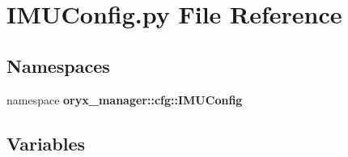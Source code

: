 \section{\-I\-M\-U\-Config.\-py \-File \-Reference}
\label{IMUConfig_8py}
\subsection*{\-Namespaces}
\begin{DoxyCompactItemize}
\item 
namespace {\bf oryx\-\_\-manager\-::cfg\-::\-I\-M\-U\-Config}
\end{DoxyCompactItemize}
\subsection*{\-Variables}

